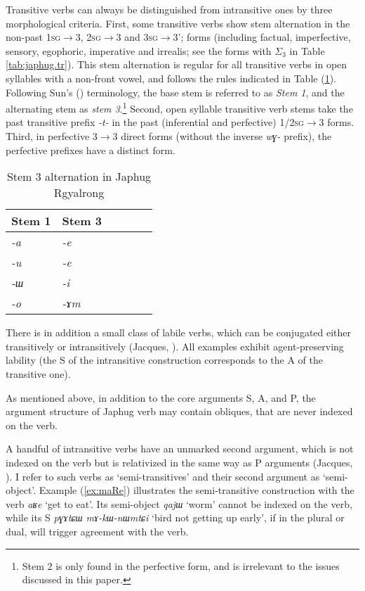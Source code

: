 \documentclass[oneside,a4paper,11pt]{article}
\newcommand{\ipa}[1]{{\phon\textit{\mbox{#1}}}} %
\newcommand{\refb}[1]{(\ref{#1})}
\newcommand{\sigc}{$\Sigma_3$}
\begin{document}
Transitive verbs can always be distinguished from intransitive ones by three morphological criteria. First, some transitive verbs show stem alternation in the non-past \textsc{1sg}$\rightarrow$3, \textsc{2sg}$\rightarrow$3 and \textsc{3sg}$\rightarrow$3'; forms (including factual, imperfective, sensory, egophoric, imperative and irrealis; see the forms with \sigc{} in Table \ref{tab:japhug.tr}). This stem alternation is regular for all transitive verbs in open syllables with a non-front vowel, and follows the rules indicated  in Table \refb{tab:stem3}. Following Sun's (\citeyear{jackson00puxi}) terminology, the base stem is referred to as \textit{Stem 1}, and the alternating stem as \textit{stem 3}.\footnote{Stem 2 is only found in the perfective form, and is irrelevant to the issues discussed in this paper.}  Second, open syllable transitive verb stems take the past transitive prefix \ipa{-t-} in the past (inferential and perfective) \textsc{1/2sg}$\rightarrow$3 forms.  Third, in perfective 3$\rightarrow$3 direct forms (without the inverse \ipa{wɣ-} prefix), the perfective prefixes have a distinct form.

 \begin{table}[H]
\caption{Stem 3 alternation in Japhug Rgyalrong} \label{tab:stem3} \centering
\begin{tabular}{llllll}
\toprule
Stem 1 & Stem 3 \\
\midrule
\ipa{-a} & \ipa{-e} \\
\ipa{-u} & \ipa{-e} \\
\ipa{-ɯ} & \ipa{-i} \\
\ipa{-o} & \ipa{-ɤm} \\
\bottomrule
\end{tabular}
\end{table}

There is in addition a small class of labile verbs, which can be conjugated either transitively or intransitively (Jacques, \citeyear{jacques12demotion}). All examples exhibit agent-preserving  lability (the S of the intransitive construction corresponds to the A of the transitive one).
  
As mentioned above, in addition to the core arguments S, A, and P, the argument structure of Japhug verb may contain obliques, that are never indexed on the verb.
  
A handful of intransitive verbs have an unmarked second argument, which is not indexed on the verb but is relativized in the same way as P arguments (Jacques, \citeyear{jacques16relatives}). I refer to such verbs as `semi-transitives' and their second argument as `semi-object'.  Example \refb{ex:maRe} illustrates the semi-transitive construction with the verb \ipa{aʁe} `get to eat'. Its semi-object \ipa{qajɯ} `worm' cannot be indexed on the verb, while its S \ipa{pɣɤtɕɯ}  	\ipa{mɤ-kɯ-nɯmtɕi}  `bird not getting up early', if in the plural or dual, will trigger agreement with the verb.
  
\end{document}
